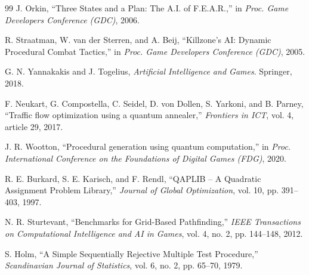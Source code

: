 \documentclass[12pt, a4paper]{article}
\begin{document}
\begin{thebibliography}{99}
J. Orkin,
``Three States and a Plan: The A.I. of F.E.A.R.,''
in \textit{Proc. Game Developers Conference (GDC)}, 2006.

R. Straatman, W. van der Sterren, and A. Beij,
``Killzone's AI: Dynamic Procedural Combat Tactics,''
in \textit{Proc. Game Developers Conference (GDC)}, 2005.

G. N. Yannakakis and J. Togelius,
\textit{Artificial Intelligence and Games}.
Springer, 2018.

F. Neukart, G. Compostella, C. Seidel, D. von Dollen, S. Yarkoni, and B. Parney,
``Traffic flow optimization using a quantum annealer,''
\textit{Frontiers in ICT}, vol. 4, article 29, 2017.

J. R. Wootton,
``Procedural generation using quantum computation,''
in \textit{Proc. International Conference on the Foundations of Digital Games (FDG)}, 2020.

R. E. Burkard, S. E. Karisch, and F. Rendl,
``QAPLIB -- A Quadratic Assignment Problem Library,''
\textit{Journal of Global Optimization}, vol. 10, pp. 391--403, 1997.

N. R. Sturtevant,
``Benchmarks for Grid-Based Pathfinding,''
\textit{IEEE Transactions on Computational Intelligence and AI in Games}, vol. 4, no. 2, pp. 144--148, 2012.

S. Holm,
``A Simple Sequentially Rejective Multiple Test Procedure,''
\textit{Scandinavian Journal of Statistics}, vol. 6, no. 2, pp. 65--70, 1979.

\end{thebibliography}
\end{document}

